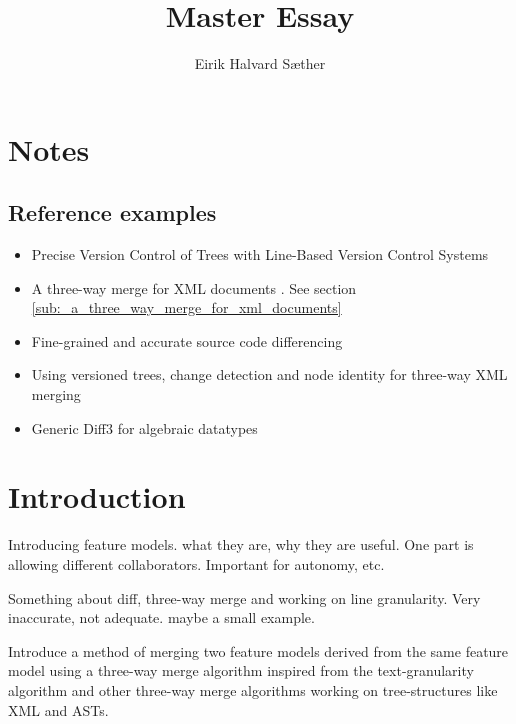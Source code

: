 \documentclass[a4paper,english]{ifimaster}
\title{Master Essay}
\author{Eirik Halvard Sæther}
\begin{document}
\maketitle
\newpage

\frontmatter{}

\tableofcontents

\mainmatter{}

\chapter{Notes}

\section{Reference examples}%
\label{sec:reference_examples}

\begin{itemize}
	\item Precise Version Control of Trees with Line-Based Version Control Systems \parencite{precise-version-control-of-trees}
	\item A three-way merge for {XML} documents \parencite{lindholm-xml-merge}. See section \ref{sub:_a_three_way_merge_for_xml_documents}
	\item Fine-grained and accurate source code differencing \parencite{fine-grained-source-code-diff}
	\item Using versioned trees, change detection and node identity for three-way {XML} merging \parencite{cheng-ethan-xml-merge}
	\item Generic Diff3 for algebraic datatypes \parencite{generic-diff-for-adt}


\end{itemize}

\chapter{Introduction}
\label{cha:introduction}

Introducing feature models. what they are, why they are useful. One part is allowing different collaborators. Important for autonomy, etc.

Something about diff, three-way merge and working on line granularity. Very inaccurate, not adequate. maybe a small example.

Introduce a method of merging two feature models derived from the same feature model using a three-way merge algorithm inspired from the text-granularity algorithm and other three-way merge algorithms working on tree-structures like XML and ASTs.
\end{document}
